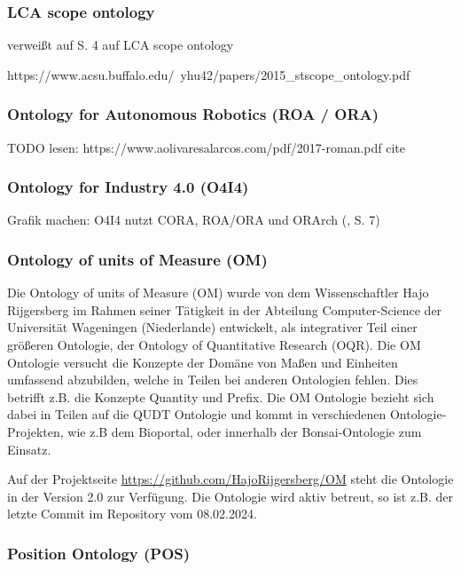 \documentclass{article}
\begin{document}
\subsubsection{LCA scope ontology}

\cite{vardem2015anminimal} verweißt auf S. 4 auf LCA scope ontology

https://www.acsu.buffalo.edu/~yhu42/papers/2015\_stscope\_ontology.pdf

\subsubsection{Ontology for Autonomous Robotics (ROA / ORA)}
TODO lesen: https://www.aolivaresalarcos.com/pdf/2017-roman.pdf
cite \cite{olszewska2017ontology}

\subsubsection{Ontology for Industry 4.0 (O4I4)}

\cite{kumar2019ontologies}

Grafik machen: O4I4 nutzt CORA, ROA/ORA und ORArch (\cite{kumar2019ontologies}, S. 7)

\subsubsection{Ontology of units of Measure (OM)}

Die Ontology of units of Measure (OM) wurde von dem Wissenschaftler Hajo Rijgersberg im Rahmen seiner Tätigkeit in der Abteilung Computer-Science der Universität Wageningen (Niederlande) entwickelt, als integrativer Teil einer größeren Ontologie\cite{rijgersberg2013ontology}, der Ontology of Quantitative Research (OQR).
Die OM Ontologie versucht die Konzepte der Domäne von Maßen und Einheiten umfassend abzubilden, welche in Teilen bei anderen Ontologien fehlen. Dies betrifft z.B. die Konzepte Quantity und Prefix. Die OM Ontologie bezieht sich dabei in Teilen auf die QUDT Ontologie und kommt in verschiedenen Ontologie-Projekten, wie z.B dem Bioportal\cite{OM_BioPortal}, oder innerhalb der Bonsai-Ontologie \cite{ghose2022core} zum Einsatz.

Auf der Projektseite \url{https://github.com/HajoRijgersberg/OM} steht die Ontologie in der Version 2.0 zur Verfügung. Die Ontologie wird aktiv betreut, so ist z.B. der letzte Commit im Repository vom 08.02.2024.

\subsubsection{Position Ontology (POS)}
\end{document}
